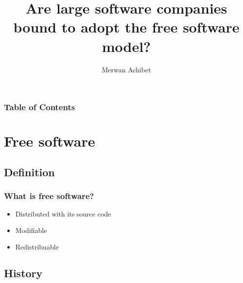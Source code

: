 \documentclass{beamer}
\title{Are large software companies bound to adopt the free software model?}
\author{Merwan Achibet}
\institute{Université du Havre}
\date{}
\begin{document}
\maketitle

\begin{frame}
  \frametitle{Table of Contents}
  \tableofcontents
\end{frame}

\section{Free software}

\subsection{Definition}

\begin{frame}

  \frametitle{What is free software?}

  \begin{itemize}
    \item<1->{Distributed with its source code}
    \item<2->{Modifiable}
    \item<3->{Redistribuable}
  \end{itemize}

  \pause

  \vfill



\end{frame}

\subsection{History}
\end{document}
